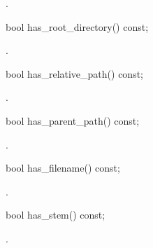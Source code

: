 \begin{itemdescr}
\pnum
\returns {}.
\end{itemdescr}

\begin{itemdecl}
bool has_root_directory() const;
\end{itemdecl}

\begin{itemdescr}
\pnum
\returns {}.
\end{itemdescr}

\begin{itemdecl}
bool has_relative_path() const;
\end{itemdecl}

\begin{itemdescr}
\pnum
\returns {}.
\end{itemdescr}

\begin{itemdecl}
bool has_parent_path() const;
\end{itemdecl}

\begin{itemdescr}
\pnum
\returns {}.
\end{itemdescr}

\begin{itemdecl}
bool has_filename() const;
\end{itemdecl}

\begin{itemdescr}
\pnum
\returns {}.
\end{itemdescr}

\begin{itemdecl}
bool has_stem() const;
\end{itemdecl}

\begin{itemdescr}
\pnum
\returns {}.
\end{itemdescr}

